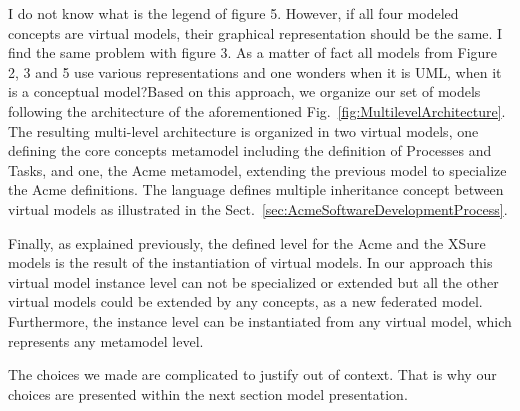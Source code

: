 {\color{red} I do not know what is the legend of figure 5.  However, if all four modeled concepts are virtual models, their graphical representation should be the same. I find the same problem with figure 3. As a matter of fact all models from Figure 2, 3 and 5 use various representations and one wonders when it is UML, when it is a conceptual model?}Based on this approach, we organize our set of models following the
architecture of the aforementioned Fig.~\ref{fig:MultilevelArchitecture}. The
resulting multi-level architecture is organized in two virtual models, one
defining the core concepts metamodel including the definition of Processes and
Tasks, and one, the Acme metamodel, extending the previous model to specialize
the Acme definitions. The \FML language defines multiple inheritance concept
between virtual models as illustrated in the Sect.~\ref{sec:AcmeSoftwareDevelopmentProcess}.

Finally, as explained previously, the defined level for the Acme  and the XSure models is the result of the instantiation of virtual models. In our approach this virtual model instance level can not be specialized or extended but all the other virtual models could be extended by any concepts, as a new federated model.
Furthermore, the instance level can be instantiated from any virtual model, which represents any metamodel level.




The choices we made are complicated to justify out of context. That is why our choices are presented within the next section model presentation.



